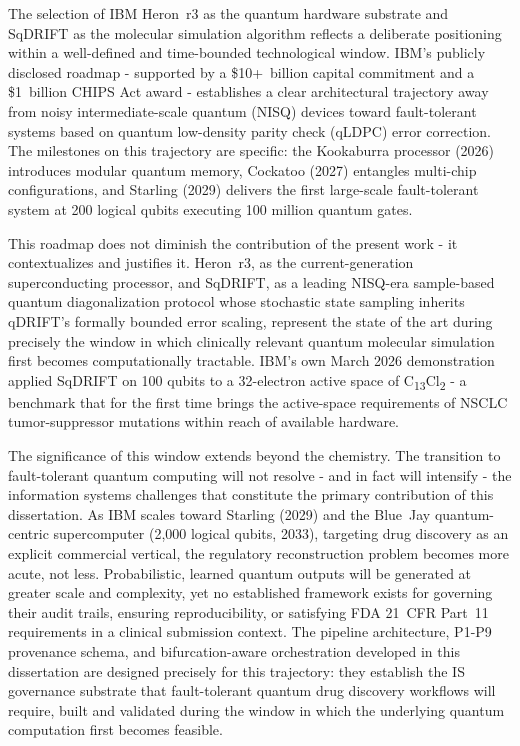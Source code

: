 \documentclass[11pt,letterpaper]{article}
\begin{document}
The selection of IBM Heron~r3 as the quantum hardware substrate and SqDRIFT as the
molecular simulation algorithm reflects a deliberate positioning within a well-defined and
time-bounded technological window.  IBM's publicly disclosed roadmap - supported by a
\$10+~billion capital commitment and a \$1~billion CHIPS Act award - establishes a clear
architectural trajectory away from noisy intermediate-scale quantum (NISQ) devices toward
fault-tolerant systems based on quantum low-density parity check (qLDPC) error correction.
The milestones on this trajectory are specific: the Kookaburra processor (2026) introduces
modular quantum memory, Cockatoo (2027) entangles multi-chip configurations, and Starling
(2029) delivers the first large-scale fault-tolerant system at 200 logical qubits executing
100 million quantum gates.

This roadmap does not diminish the contribution of the present work - it contextualizes and
justifies it.  Heron~r3, as the current-generation superconducting processor, and SqDRIFT,
as a leading NISQ-era sample-based quantum diagonalization protocol whose stochastic state
sampling inherits qDRIFT's formally bounded error scaling, represent the state of the art during precisely the window in which clinically
relevant quantum molecular simulation first becomes computationally tractable.  IBM's own
March 2026 demonstration applied SqDRIFT on 100 qubits to a 32-electron active space of
C\textsubscript{13}Cl\textsubscript{2} - a benchmark that for the first
time brings the active-space requirements of NSCLC tumor-suppressor mutations within reach
of available hardware.

The significance of this window extends beyond the chemistry.  The transition to
fault-tolerant quantum computing will not resolve - and in fact will intensify - the
information systems challenges that constitute the primary contribution of this
dissertation.  As IBM scales toward Starling (2029) and the Blue~Jay quantum-centric
supercomputer (2,000 logical qubits, 2033), targeting drug discovery as an explicit
commercial vertical, the regulatory reconstruction problem becomes more acute, not less.
Probabilistic, learned quantum outputs will be generated at greater scale and complexity,
yet no established framework exists for governing their audit trails, ensuring
reproducibility, or satisfying FDA 21~CFR Part~11 requirements in a clinical submission
context.  The pipeline architecture, P1-P9 provenance schema, and bifurcation-aware
orchestration developed in this dissertation are designed precisely for this trajectory:
they establish the IS governance substrate that fault-tolerant quantum drug discovery
workflows will require, built and validated during the window in which the underlying
quantum computation first becomes feasible.
\end{document}
